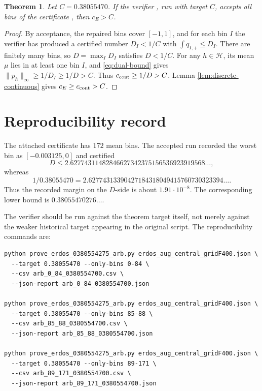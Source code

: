 \documentclass[a4paper]{amsart}
\newtheorem{theorem}{Theorem}
\begin{document}
\begin{theorem}\label{thm:main}
Let $C=0.38055470$.  If the verifier , run with target $C$, accepts all bins of the certificate , then $c_E>C$.
\end{theorem}

\begin{proof}
By acceptance, the repaired bins cover $[-1,1]$, and for each bin $I$ the verifier has produced a certified number $D_I<1/C$ with $\int q_{I,+}\le D_I$.  There are finitely many bins, so $D=\max_I D_I$ satisfies $D<1/C$.  For any $h\in\mathcal H$, its mean $\mu$ lies in at least one bin $I$, and \eqref{eq:dual-bound} gives $\|p_h\|_\infty\ge1/D_I\ge1/D>C$.  Thus $c_{\rm cont}\ge1/D>C$.  Lemma \ref{lem:discrete-continuous} gives $c_E\ge c_{\rm cont}>C$.
\end{proof}

\section{Reproducibility record}

The attached certificate has $172$ mean bins.  The accepted run recorded the worst bin as $[-0.003125,0]$ and certified
\[
 D\le 2.62774311482846627342375156536923919568\ldots,
\]
whereas
\[
 1/0.38055470=2.62774313390427184318049415760730323394\ldots .
\]
Thus the recorded margin on the $D$-side is about $1.91\cdot10^{-8}$.  The corresponding lower bound is $0.38055470276\ldots$.

The verifier should be run against the theorem target itself, not merely against the weaker historical target appearing in the original script.  The reproducibility commands are:

\begin{verbatim}
python prove_erdos_0380554275_arb.py erdos_aug_central_gridF400.json \
  --target 0.38055470 --only-bins 0-84 \
  --csv arb_0_84_0380554700.csv \
  --json-report arb_0_84_0380554700.json

python prove_erdos_0380554275_arb.py erdos_aug_central_gridF400.json \
  --target 0.38055470 --only-bins 85-88 \
  --csv arb_85_88_0380554700.csv \
  --json-report arb_85_88_0380554700.json

python prove_erdos_0380554275_arb.py erdos_aug_central_gridF400.json \
  --target 0.38055470 --only-bins 89-171 \
  --csv arb_89_171_0380554700.csv \
  --json-report arb_89_171_0380554700.json
\end{verbatim}
\end{document}

